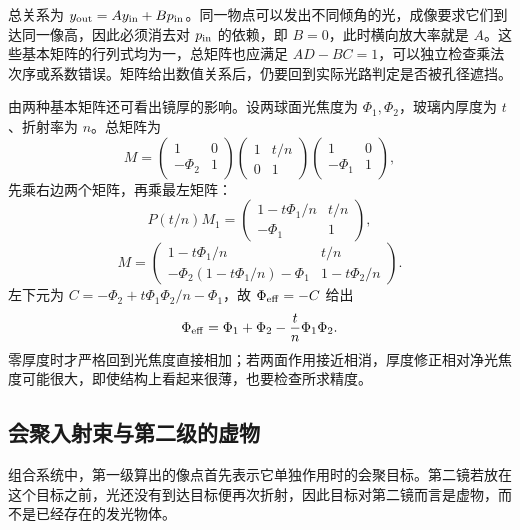总关系为 $y_{\rm out}=Ay_{\rm in}+Bp_{\rm in}$。同一物点可以发出不同倾角的光，成像要求它们到达同一像高，因此必须消去对 $p_{\rm in}$ 的依赖，即 $B=0$，此时横向放大率就是 $A$。这些基本矩阵的行列式均为一，总矩阵也应满足 $AD-BC=1$，可以独立检查乘法次序或系数错误。矩阵给出数值关系后，仍要回到实际光路判定是否被孔径遮挡。



由两种基本矩阵还可看出镜厚的影响。设两球面光焦度为 $\Phi_1,\Phi_2$，玻璃内厚度为 $t$、折射率为 $n$。总矩阵为
\[
M=\begin{pmatrix}1&0\\-\Phi_2&1\end{pmatrix}
\begin{pmatrix}1&t/n\\0&1\end{pmatrix}
\begin{pmatrix}1&0\\-\Phi_1&1\end{pmatrix},
\]
先乘右边两个矩阵，再乘最左矩阵：
\[
P(t/n)M_1=
\begin{pmatrix}1-t\Phi_1/n&t/n\\-\Phi_1&1\end{pmatrix},
\]
\[
M=
\begin{pmatrix}
1-t\Phi_1/n&t/n\\
-\Phi_2(1-t\Phi_1/n)-\Phi_1&1-t\Phi_2/n
\end{pmatrix}.
\]
左下元为 $C=-\Phi_2+t\Phi_1\Phi_2/n-\Phi_1$，故 $\Phi_{\rm eff}=-C$ 给出
\[
\Phi_{\rm eff}=\Phi_1+\Phi_2-\frac tn\Phi_1\Phi_2.
\]
零厚度时才严格回到光焦度直接相加；若两面作用接近相消，厚度修正相对净光焦度可能很大，即使结构上看起来很薄，也要检查所求精度。


\subsection{会聚入射束与第二级的虚物}

组合系统中，第一级算出的像点首先表示它单独作用时的会聚目标。第二镜若放在这个目标之前，光还没有到达目标便再次折射，因此目标对第二镜而言是虚物，而不是已经存在的发光物体。

